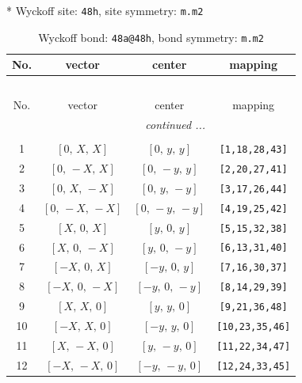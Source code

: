 \documentclass[fleqn,8pt]{jsarticle}
\begin{document}
* Wyckoff site: {\tt 48h}, site symmetry: {\tt m.m2}
\renewcommand{\arraystretch}{1.2}
\begin{longtable}{cccc}
\caption{Wyckoff bond: {\tt 48a@48h}, bond symmetry: {\tt m.m2}}
 \\
 \hline \hline
No. & vector & center & mapping \\ \hline \endfirsthead

\multicolumn{3}{l}{\tablename\ \thetable{}} \\
 \hline \hline
No. & vector & center & mapping \\ \hline \endhead

 \hline \hline
\multicolumn{3}{r}{\footnotesize\it continued ...} \\ \endfoot

 \hline \hline
\multicolumn{3}{r}{} \\ \endlastfoot

1 & $\left[ 0,\, X,\, X \right]$ & $\left[ 0,\, y,\, y \right]$ & {\tt [1,18,28,43]} \\ \hline
2 & $\left[ 0,\, - X,\, X \right]$ & $\left[ 0,\, - y,\, y \right]$ & {\tt [2,20,27,41]} \\ \hline
3 & $\left[ 0,\, X,\, - X \right]$ & $\left[ 0,\, y,\, - y \right]$ & {\tt [3,17,26,44]} \\ \hline
4 & $\left[ 0,\, - X,\, - X \right]$ & $\left[ 0,\, - y,\, - y \right]$ & {\tt [4,19,25,42]} \\ \hline
5 & $\left[ X,\, 0,\, X \right]$ & $\left[ y,\, 0,\, y \right]$ & {\tt [5,15,32,38]} \\ \hline
6 & $\left[ X,\, 0,\, - X \right]$ & $\left[ y,\, 0,\, - y \right]$ & {\tt [6,13,31,40]} \\ \hline
7 & $\left[ - X,\, 0,\, X \right]$ & $\left[ - y,\, 0,\, y \right]$ & {\tt [7,16,30,37]} \\ \hline
8 & $\left[ - X,\, 0,\, - X \right]$ & $\left[ - y,\, 0,\, - y \right]$ & {\tt [8,14,29,39]} \\ \hline
9 & $\left[ X,\, X,\, 0 \right]$ & $\left[ y,\, y,\, 0 \right]$ & {\tt [9,21,36,48]} \\ \hline
10 & $\left[ - X,\, X,\, 0 \right]$ & $\left[ - y,\, y,\, 0 \right]$ & {\tt [10,23,35,46]} \\ \hline
11 & $\left[ X,\, - X,\, 0 \right]$ & $\left[ y,\, - y,\, 0 \right]$ & {\tt [11,22,34,47]} \\ \hline
12 & $\left[ - X,\, - X,\, 0 \right]$ & $\left[ - y,\, - y,\, 0 \right]$ & {\tt [12,24,33,45]} \\
\end{longtable}
\end{document}
